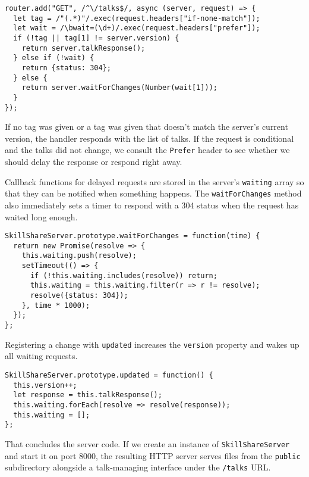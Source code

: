\begin{lstlisting}
router.add("GET", /^\/talks$/, async (server, request) => {
  let tag = /"(.*)"/.exec(request.headers["if-none-match"]);
  let wait = /\bwait=(\d+)/.exec(request.headers["prefer"]);
  if (!tag || tag[1] != server.version) {
    return server.talkResponse();
  } else if (!wait) {
    return {status: 304};
  } else {
    return server.waitForChanges(Number(wait[1]));
  }
});
\end{lstlisting}
\noindent{}

If no tag was given or a tag was given that doesn't match the server's current version, the handler responds with the list of talks. If the request is conditional and the talks did not change, we consult the \lstinline`Prefer` header to see whether we should delay the response or respond right away.

Callback functions for delayed requests are stored in the server's \lstinline`waiting` array so that they can be notified when something happens. The \lstinline`waitForChanges` method also immediately sets a timer to respond with a 304 status when the request has waited long enough.

\begin{lstlisting}
SkillShareServer.prototype.waitForChanges = function(time) {
  return new Promise(resolve => {
    this.waiting.push(resolve);
    setTimeout(() => {
      if (!this.waiting.includes(resolve)) return;
      this.waiting = this.waiting.filter(r => r != resolve);
      resolve({status: 304});
    }, time * 1000);
  });
};
\end{lstlisting}
\noindent{}

\label{skillsharing.updated}Registering a change with \lstinline`updated` increases the \lstinline`version` property and wakes up all waiting requests.

\begin{lstlisting}
SkillShareServer.prototype.updated = function() {
  this.version++;
  let response = this.talkResponse();
  this.waiting.forEach(resolve => resolve(response));
  this.waiting = [];
};
\end{lstlisting}
\noindent{}

That concludes the server code. If we create an instance of \lstinline`SkillShareServer` and start it on port 8000, the resulting HTTP server serves files from the \lstinline`public` subdirectory alongside a talk-managing interface under the \lstinline`/talks` URL.

